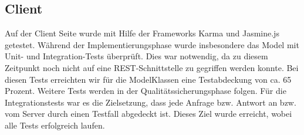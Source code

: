\subsection{Client}
Auf der Client Seite wurde mit Hilfe der Frameworks Karma und Jasmine.js getestet.
Während der Implementierungsphase wurde insbesondere das Model mit Unit- und Integration-Tests überprüft.
Dies war notwendig, da zu diesem Zeitpunkt noch nicht auf eine REST-Schnittstelle zu gegriffen werden konnte.
Bei diesen Tests erreichten wir für die ModelKlassen eine Testabdeckung von ca. 65 Prozent. Weitere Tests werden in der Qualitätssicherungsphase folgen.
Für die Integrationstests war es die Zielsetzung, dass jede Anfrage bzw. Antwort an bzw. vom Server durch einen Testfall abgedeckt ist.
Dieses Ziel wurde erreicht, wobei alle Tests erfolgreich laufen.

